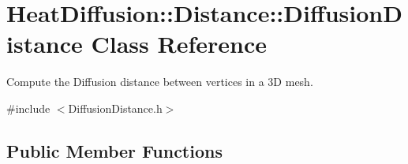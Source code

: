\hypertarget{classHeatDiffusion_1_1Distance_1_1DiffusionDistance}{\section{Heat\-Diffusion\-:\-:Distance\-:\-:Diffusion\-Distance Class Reference}
\label{classHeatDiffusion_1_1Distance_1_1DiffusionDistance}
}


Compute the Diffusion distance between vertices in a 3\-D mesh.  




{\ttfamily \#include $<$Diffusion\-Distance.\-h$>$}

\subsection*{Public Member Functions}
